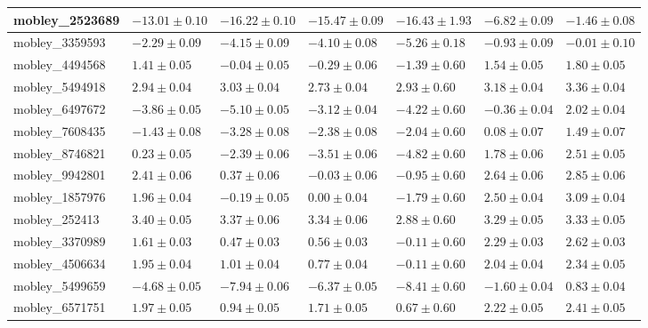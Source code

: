 \documentclass{article}
\begin{document}
\begin{landscape}
\begin{longtable}{|l{3.0cm}|l{3.0cm}|l{3.2cm}|l{3.6cm}|l{3.0cm}|l{3.0cm}|l{3.0cm}|}
mobley\_2523689	&	$	-13.01	\pm	0.10	$	&	$	-16.22	\pm	0.10	$	&	$	-15.47	\pm	0.09	$	&	$	-16.43	\pm	1.93	$	&	$	-6.82	\pm	0.09	$	&	$	-1.46	\pm	0.08	$	\\ \hline
mobley\_3359593	&	$	-2.29	\pm	0.09	$	&	$	-4.15	\pm	0.09	$	&	$	-4.10	\pm	0.08	$	&	$	-5.26	\pm	0.18	$	&	$	-0.93	\pm	0.09	$	&	$	-0.01	\pm	0.10	$	\\ \hline
mobley\_4494568	&	$	1.41	\pm	0.05	$	&	$	-0.04	\pm	0.05	$	&	$	-0.29	\pm	0.06	$	&	$	-1.39	\pm	0.60	$	&	$	1.54	\pm	0.05	$	&	$	1.80	\pm	0.05	$	\\ \hline
mobley\_5494918	&	$	2.94	\pm	0.04	$	&	$	3.03	\pm	0.04	$	&	$	2.73	\pm	0.04	$	&	$	2.93	\pm	0.60	$	&	$	3.18	\pm	0.04	$	&	$	3.36	\pm	0.04	$	\\ \hline
mobley\_6497672	&	$	-3.86	\pm	0.05	$	&	$	-5.10	\pm	0.05	$	&	$	-3.12	\pm	0.04	$	&	$	-4.22	\pm	0.60	$	&	$	-0.36	\pm	0.04	$	&	$	2.02	\pm	0.04	$	\\ \hline
mobley\_7608435	&	$	-1.43	\pm	0.08	$	&	$	-3.28	\pm	0.08	$	&	$	-2.38	\pm	0.08	$	&	$	-2.04	\pm	0.60	$	&	$	0.08	\pm	0.07	$	&	$	1.49	\pm	0.07	$	\\ \hline
mobley\_8746821	&	$	0.23	\pm	0.05	$	&	$	-2.39	\pm	0.06	$	&	$	-3.51	\pm	0.06	$	&	$	-4.82	\pm	0.60	$	&	$	1.78	\pm	0.06	$	&	$	2.51	\pm	0.05	$	\\ \hline
mobley\_9942801	&	$	2.41	\pm	0.06	$	&	$	0.37	\pm	0.06	$	&	$	-0.03	\pm	0.06	$	&	$	-0.95	\pm	0.60	$	&	$	2.64	\pm	0.06	$	&	$	2.85	\pm	0.06	$	\\ \hline
mobley\_1857976	&	$	1.96	\pm	0.04	$	&	$	-0.19	\pm	0.05	$	&	$	0.00	\pm	0.04	$	&	$	-1.79	\pm	0.60	$	&	$	2.50	\pm	0.04	$	&	$	3.09	\pm	0.04	$	\\ \hline
mobley\_252413	&	$	3.40	\pm	0.05	$	&	$	3.37	\pm	0.06	$	&	$	3.34	\pm	0.06	$	&	$	2.88	\pm	0.60	$	&	$	3.29	\pm	0.05	$	&	$	3.33	\pm	0.05	$	\\ \hline
mobley\_3370989	&	$	1.61	\pm	0.03	$	&	$	0.47	\pm	0.03	$	&	$	0.56	\pm	0.03	$	&	$	-0.11	\pm	0.60	$	&	$	2.29	\pm	0.03	$	&	$	2.62	\pm	0.03	$	\\ \hline
mobley\_4506634	&	$	1.95	\pm	0.04	$	&	$	1.01	\pm	0.04	$	&	$	0.77	\pm	0.04	$	&	$	-0.11	\pm	0.60	$	&	$	2.04	\pm	0.04	$	&	$	2.34	\pm	0.05	$	\\ \hline
mobley\_5499659	&	$	-4.68	\pm	0.05	$	&	$	-7.94	\pm	0.06	$	&	$	-6.37	\pm	0.05	$	&	$	-8.41	\pm	0.60	$	&	$	-1.60	\pm	0.04	$	&	$	0.83	\pm	0.04	$	\\ \hline
mobley\_6571751	&	$	1.97	\pm	0.05	$	&	$	0.94	\pm	0.05	$	&	$	1.71	\pm	0.05	$	&	$	0.67	\pm	0.60	$	&	$	2.22	\pm	0.05	$	&	$	2.41	\pm	0.05	$	\\ \hline

\end{longtable}
\end{landscape}
\end{document}
